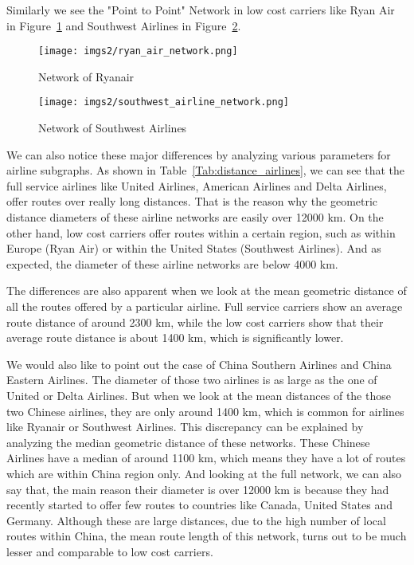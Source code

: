 \documentclass[twocolumn]{tum-article}
\begin{document}
Similarly we see the "Point to Point" Network in low cost carriers like Ryan Air in Figure~\ref{fig:ryan_air} and Southwest Airlines in Figure~\ref{fig:southwest_airline}.

\begin{figure}
        \centering
        \texttt{[image: imgs2/ryan\_air\_network.png]}
        \caption{
Network of Ryanair}
        \label{fig:ryan_air}
\end{figure}

\begin{figure}
        \centering
        \texttt{[image: imgs2/southwest\_airline\_network.png]}
        \caption{
Network of Southwest Airlines}
        \label{fig:southwest_airline}
\end{figure}


We can also notice these major differences by analyzing various parameters for airline subgraphs.
As shown in Table~\ref{Tab:distance_airlines}, we can see that the full service airlines like United Airlines, American Airlines and Delta Airlines, offer routes over really long distances.
That is the reason why the geometric distance diameters of these airline networks are easily over 12000 km.
On the other hand, low cost carriers offer routes within a certain region, such as within Europe (Ryan Air) or within the United States (Southwest Airlines).
And as expected, the diameter of these airline networks are below 4000 km. 


The differences are also apparent when we look at the mean geometric distance of all the routes offered by a particular airline.
Full service carriers show an average route distance of around 2300 km, while the low cost carriers show that their average route distance is about 1400 km, which is significantly lower.


We would also like to point out the case of China Southern Airlines and China Eastern Airlines.
The diameter of those two airlines is as large as the one of United or Delta Airlines. 
But when we look at the mean distances of the those two Chinese airlines, they are only around 1400 km, which is common for airlines like Ryanair or Southwest Airlines.
This discrepancy can be explained by analyzing the median geometric distance of these networks.
These Chinese Airlines have a median of around 1100 km, which means they have a lot of routes which are within China region only. 
And looking at the full network, we can also say that, the main reason their diameter is over 12000 km is because they had recently started to offer few routes to countries like Canada, United States and Germany.
Although these are large distances, due to the high number of local routes within China, the mean route length of this network, turns out to be much lesser and comparable to low cost carriers. 
\end{document}
